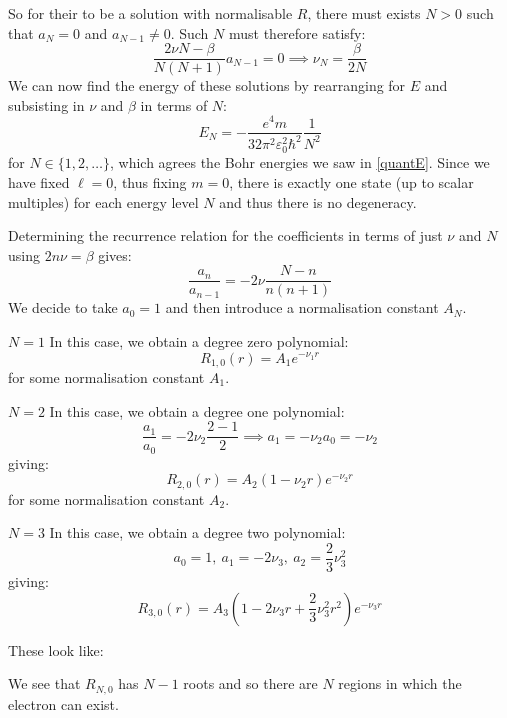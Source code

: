 \documentclass[../main.tex]{subfiles}
\begin{document}
So for their to be a solution with normalisable $R$, there must exists $N > 0$ such that $a_N = 0$ and $a_{N - 1} \neq 0$.
Such $N$ must therefore satisfy:
\[
  \frac{2\nu N - \beta}{N(N + 1)} a_{N - 1} = 0 \implies \nu_{N} = \frac{\beta}{2N}
\]
We can now find the energy of these solutions by rearranging for $E$ and subsisting in $\nu$ and $\beta$ in terms of $N$:
\[
  E_N = - \frac{e^{4}m}{32 \pi^2 \varepsilon^2_0 \hbar^2} \frac{1}{N^2}
\]
for $N \in \{1, 2, \ldots\}$, which agrees the Bohr energies we saw in \cref{quantE}.
Since we have fixed $\ell = 0$, thus fixing $m = 0$, there is exactly one state (up to scalar multiples) for each energy level $N$ and thus there is no degeneracy.

Determining the recurrence relation for the coefficients in terms of just $\nu$ and $N$ using $2n\nu = \beta$ gives:
\[
  \frac{a_n}{a_{n - 1}} = - 2\nu \frac{N - n}{n(n + 1)}
\]
We decide to take $a_0 = 1$ and then introduce a normalisation constant $A_N$.
\begin{proofcases}
  \begin{case}{$N = 1$}
In this case, we obtain a degree zero polynomial:
    \[
      R_{1, 0}(r) = A_1 e^{-\nu_1 r}
    \]
    for some normalisation constant $A_1$.
  \end{case}
  \begin{case}{$N = 2$}
    In this case, we obtain a degree one polynomial:
    \[
      \frac{a_1}{a_0} = -2\nu_2 \frac{2 - 1}{2} \implies a_1 = -\nu_2 a_0 = -\nu_2
    \]
    giving:
    \[
      R_{2, 0}(r) = A_2 (1 - \nu_2 r) e^{-\nu_2 r}
    \]
    for some normalisation constant $A_2$.
  \end{case}
  \begin{case}{$N = 3$}
    In this case, we obtain a degree two polynomial:
    \[
      a_0 = 1,\ a_1 = -2\nu_3,\ a_2 = \frac{2}{3}\nu^2_3
    \]
    giving:
    \[
      R_{3, 0}(r) = A_3\left(1 - 2\nu_3 r + \frac{2}{3} \nu^2_3 r^2\right) e^{-\nu_3 r}
    \]
  \end{case}
\end{proofcases}
These look like:
\begin{center}
\end{center}
We see that $R_{N, 0}$ has $N - 1$ roots and so there are $N$ regions in which the electron can exist.
\end{document}
